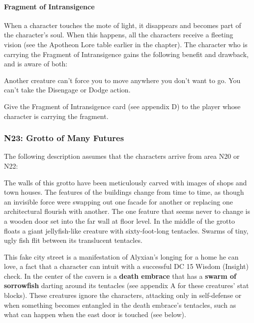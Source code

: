 \documentclass[10pt,a4,twoside,twocolumn,openany,nodeprecatedcode]{dndbook}
\begin{document}
\paragraph{Fragment of Intransigence}
When a character touches the mote of light, it disappears and becomes part of the character's soul. When this happens, all the characters receive a fleeting vision (see the Apotheon Lore table earlier in the chapter).
The character who is carrying the Fragment of Intransigence gains the following benefit and drawback, and is aware of both:
\begin{DndComment}{}
{{Another creature can't force you to move anywhere you don't want to go.}}
{{You can't take the Disengage or Dodge action.}}
\end{DndComment}

Give the Fragment of Intransigence card (see appendix D) to the player whose character is carrying the fragment.
\subsubsection{N23: Grotto of Many Futures}
The following description assumes that the characters arrive from area N20 or N22:
\begin{DndReadAloud}{}
The walls of this grotto have been meticulously carved with images of shops and town houses. The features of the buildings change from time to time, as though an invisible force were swapping out one facade for another or replacing one architectural flourish with another. The one feature that seems never to change is a wooden door set into the far wall at floor level.
In the middle of the grotto floats a giant jellyfish-like creature with sixty-foot-long tentacles. Swarms of tiny, ugly fish flit between its translucent tentacles.
\end{DndReadAloud}

This fake city street is a manifestation of Alyxian's longing for a home he can love, a fact that a character can intuit with a successful DC 15 Wisdom (Insight) check.
In the center of the cavern is a \textbf{death embrace} that has a \textbf{swarm of sorrowfish} darting around its tentacles (see appendix A for these creatures' stat blocks). These creatures ignore the characters, attacking only in self-defense or when something becomes entangled in the death embrace's tentacles, such as what can happen when the east door is touched (see below).
\end{document}
